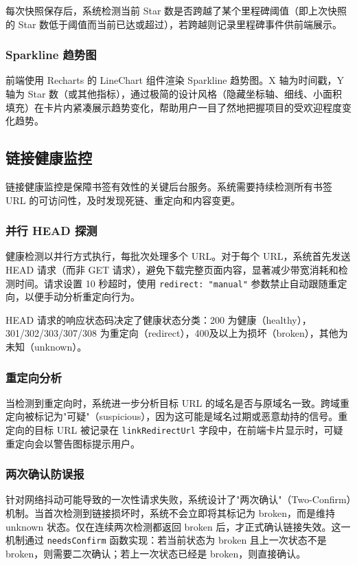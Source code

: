 \documentclass[12pt,a4paper]{ctexart}
\begin{document}
每次快照保存后，系统检测当前 Star 数是否跨越了某个里程碑阈值（即上次快照的 Star 数低于阈值而当前已达或超过），若跨越则记录里程碑事件供前端展示。

\subsubsection{Sparkline 趋势图}

前端使用 Recharts 的 LineChart 组件渲染 Sparkline 趋势图。X 轴为时间戳，Y 轴为 Star 数（或其他指标），通过极简的设计风格（隐藏坐标轴、细线、小面积填充）在卡片内紧凑展示趋势变化，帮助用户一目了然地把握项目的受欢迎程度变化趋势。

\subsection{链接健康监控}

链接健康监控是保障书签有效性的关键后台服务。系统需要持续检测所有书签 URL 的可访问性，及时发现死链、重定向和内容变更。

\subsubsection{并行 HEAD 探测}

健康检测以并行方式执行，每批次处理多个 URL。对于每个 URL，系统首先发送 HEAD 请求（而非 GET 请求），避免下载完整页面内容，显著减少带宽消耗和检测时间。请求设置 10 秒超时，使用 \texttt{redirect: "manual"} 参数禁止自动跟随重定向，以便手动分析重定向行为。

HEAD 请求的响应状态码决定了健康状态分类：200 为健康（healthy），301/302/303/307/308 为重定向（redirect），400及以上为损坏（broken），其他为未知（unknown）。

\subsubsection{重定向分析}

当检测到重定向时，系统进一步分析目标 URL 的域名是否与原域名一致。跨域重定向被标记为"可疑"（suspicious），因为这可能是域名过期或恶意劫持的信号。重定向的目标 URL 被记录在 \texttt{linkRedirectUrl} 字段中，在前端卡片显示时，可疑重定向会以警告图标提示用户。

\subsubsection{两次确认防误报}

针对网络抖动可能导致的一次性请求失败，系统设计了"两次确认"（Two-Confirm）机制。当首次检测到链接损坏时，系统不会立即将其标记为 broken，而是维持 unknown 状态。仅在连续两次检测都返回 broken 后，才正式确认链接失效。这一机制通过 \texttt{needsConfirm} 函数实现：若当前状态为 broken 且上一次状态不是 broken，则需要二次确认；若上一次状态已经是 broken，则直接确认。
\end{document}
